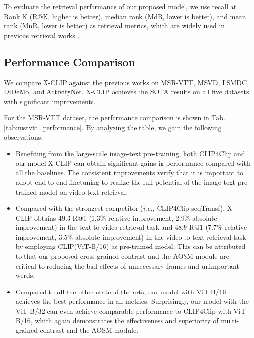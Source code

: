 \documentclass[sigconf]{acmart}
\begin{document}
To evaluate the retrieval performance of our proposed model, we use recall at Rank K (R@K, higher is better), median rank (MdR, lower is better), and mean rank (MnR, lower is better) as retrieval metrics, which are widely used in previous retrieval works \cite{yu2018joint,zhu2020actbert,lei2021less,liu2019use,gabeur2020multi,dzabraev2021mdmmt,mithun2018learning,zhang2018cross,liu2021hit,dong2019dual,bertasius2021space,arnab2021vivit,luo2021clip4clip}.




\subsection{Performance Comparison}
We compare X-CLIP against the previous works on MSR-VTT, MSVD, LSMDC, DiDeMo, and ActivityNet. X-CLIP achieves the SOTA results on all five datasets with significant improvements.  


For the MSR-VTT dataset, the performance comparison is shown in Tab. \ref{tab:mstvtt_performance}. By analyzing the table, we gain the following observations:

\begin{itemize}[leftmargin=*]
    \item Benefiting from the large-scale image-text pre-training, both CLIP4Clip and our model X-CLIP can obtain significant gains in performance compared with all the baselines. The consistent improvements verify that it is important to adopt end-to-end finetuning to realize the full potential of the image-text pre-trained model on video-text retrieval.
    
    \item Compared with the strongest competitor (\emph{i.e.,} CLIP4Clip-seqTransf), X-CLIP obtains 49.3 R@1 (6.3\% relative improvement, 2.9\% absolute improvement) in the text-to-video retrieval task and 48.9 R@1 (7.7\% relative improvement, 3.5\% absolute improvement) in the video-to-text retrieval task by employing CLIP(ViT-B/16) as pre-trained model. This can be attributed to that our proposed cross-grained contrast and the AOSM module are critical to reducing the bad effects of unnecessary frames and unimportant words.

    \item Compared to all the other state-of-the-arts, our model with ViT-B/16 achieves the best performance in all metrics. Surprisingly, our model with the ViT-B/32 can even achieve comparable performance to CLIP4Clip with ViT-B/16, which again demonstrates the effectiveness and superiority of multi-grained contrast and the AOSM module.
\end{itemize}
\end{document}
